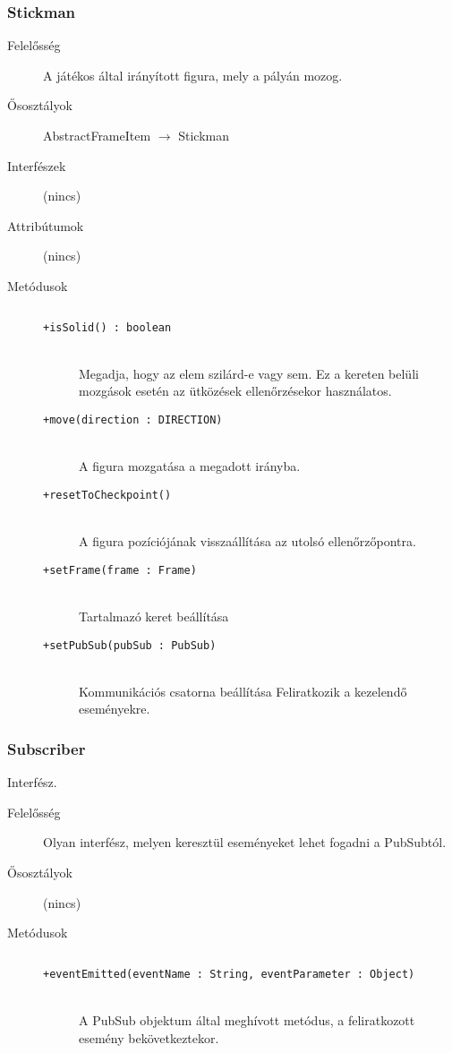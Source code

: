 		\subsubsection{Stickman}
			\begin{description}

				\item[Felelősség] A játékos által irányított figura, mely a pályán mozog.

				\item[Ősosztályok] AbstractFrameItem $\rightarrow{}$ Stickman
				\item[Interfészek] (nincs)
				\item[Attribútumok] (nincs)
				\item[Metódusok]$\ $
					\begin{description}
						\item[\texttt{+isSolid() : boolean}] \hfill \\Megadja, hogy az elem szilárd-e vagy sem.  Ez a kereten belüli mozgások esetén az  ütközések ellenőrzésekor használatos. 
						\item[\texttt{+move(direction : DIRECTION)}] \hfill \\A figura mozgatása a megadott irányba. 
						\item[\texttt{+resetToCheckpoint()}] \hfill \\A figura pozíciójának visszaállítása az  utolsó ellenőrzőpontra. 
						\item[\texttt{+setFrame(frame : Frame)}] \hfill \\Tartalmazó keret beállítása 
						\item[\texttt{+setPubSub(pubSub : PubSub)}] \hfill \\Kommunikációs csatorna beállítása    Feliratkozik a kezelendő eseményekre. 
					\end{description}
			\end{description}

		\subsubsection{Subscriber} Interfész.
			\begin{description}

				\item[Felelősség] Olyan interfész, melyen keresztül eseményeket lehet fogadni a PubSubtól.

				\item[Ősosztályok] (nincs)
				\item[Metódusok]$\ $
					\begin{description}
						\item[\texttt{+eventEmitted(eventName : String, eventParameter : Object)}] \hfill \\A PubSub objektum által meghívott metódus,  a feliratkozott esemény bekövetkeztekor. 
					\end{description}
			\end{description}

